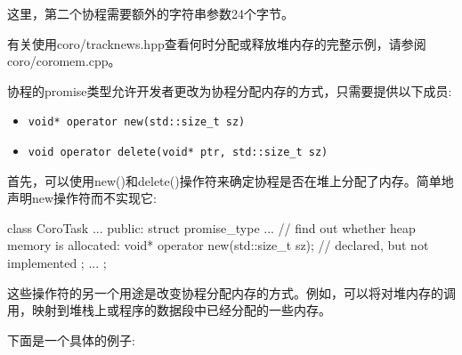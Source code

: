 
这里，第二个协程需要额外的字符串参数24个字节。

有关使用coro/tracknews.hpp查看何时分配或释放堆内存的完整示例，请参阅coro/coromem.cpp。


协程的promise类型允许开发者更改为协程分配内存的方式，只需要提供以下成员:

\begin{itemize}
\item 
\texttt{void* operator new(std::size\_t sz)}

\item 
\texttt{void operator delete(void* ptr, std::size\_t sz)}
\end{itemize}


首先，可以使用new()和delete()操作符来确定协程是否在堆上分配了内存。简单地声明new操作符而不实现它:

\begin{cpp}
class CoroTask {
	...
	public:
	struct promise_type {
		...
		// find out whether heap memory is allocated:
		void* operator new(std::size_t sz); // declared, but not implemented
	};
	...
};
\end{cpp}



这些操作符的另一个用途是改变协程分配内存的方式。例如，可以将对堆内存的调用，映射到堆栈上或程序的数据段中已经分配的一些内存。

下面是一个具体的例子:


